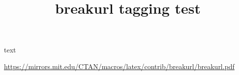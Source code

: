\documentclass{article}
\title{breakurl tagging test}
\begin{document}
text

\url{https://mirrors.mit.edu/CTAN/macros/latex/contrib/breakurl/breakurl.pdf}
\end{document}
